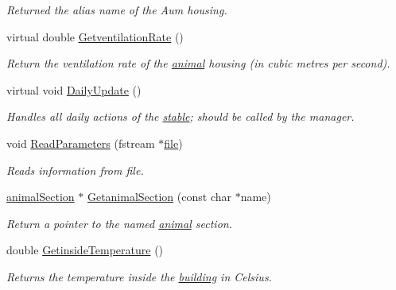 \begin{DoxyCompactItemize}
\begin{DoxyCompactList}\small\item\em Returned the alias name of the Aum housing. \item\end{DoxyCompactList}\item 
virtual double \hyperlink{classstable_a2dc443b7a16b5f1ea82e8bd393724ee1}{GetventilationRate} ()
\begin{DoxyCompactList}\small\item\em Return the ventilation rate of the \hyperlink{classanimal}{animal} housing (in cubic metres per second). \item\end{DoxyCompactList}\item 
virtual void \hyperlink{classstable_a8bdbc59976ddb6c324e7b629794ff388}{DailyUpdate} ()
\begin{DoxyCompactList}\small\item\em Handles all daily actions of the \hyperlink{classstable}{stable}; should be called by the manager. \item\end{DoxyCompactList}\item 
void \hyperlink{classstable_ab0195f308a48e008485cf5d04955a741}{ReadParameters} (fstream $\ast$\hyperlink{classbase_a3af52ee9891719d09b8b19b42450b6f6}{file})
\begin{DoxyCompactList}\small\item\em Reads information from file. \item\end{DoxyCompactList}\item 
\hyperlink{classanimal_section}{animalSection} $\ast$ \hyperlink{classstable_ad816f0c1199ebc697c10e8736e3faacc}{GetanimalSection} (const char $\ast$name)
\begin{DoxyCompactList}\small\item\em Return a pointer to the named \hyperlink{classanimal}{animal} section. \item\end{DoxyCompactList}\item 
double \hyperlink{classstable_a88a9be2c3fbd2c04e64339dfc9794661}{GetinsideTemperature} ()
\begin{DoxyCompactList}\small\item\em Returns the temperature inside the \hyperlink{classbuilding}{building} in Celsius. \item\end{DoxyCompactList}\item 

\end{DoxyCompactItemize}
